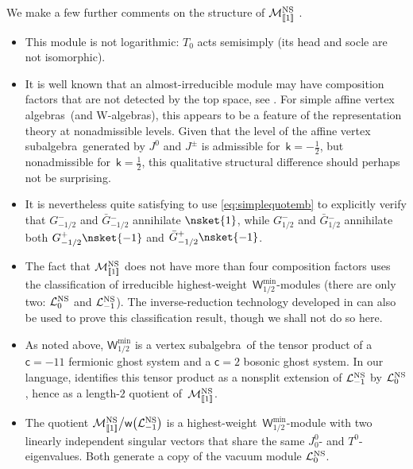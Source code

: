 \documentclass[10pt,a4paper]{amsart}
\numberwithin{equation}{section}
\newcommand{\bG}{\bar{G}{}}
\newcommand{\cc}{\mathsf{c}} %
\newcommand{\kk}{\mathsf{k}} %
\newcommand{\NS}{\textnormal{NS}}
\DeclarePairedDelimiter{\brac}{\lparen}{\rparen} %
\DeclarePairedDelimiter{\dbrac}{\llbracket}{\rrbracket} %
\newcommand{\VOA}[1]{\mathsf{#1}} %
\newcommand{\Mod}[1]{\mathcal{#1}} %
\newcommand{\swalg}[2]{\VOA{W}_{#1}^{\mathrm{#2}}} %
\newcommand{\smin}[1][\kk]{\swalg{#1}{min}} %
\newcommand{\nconjsymb}{\mathsf{w}} %
\newcommand{\nconj}{\nconjsymb \brac}
\newcommand{\nnsrel}[1]{\Mod{M}^{\NS}_{\vphantom{[#1]}\smash{\dbrac{#1}}}} %
\newcommand{\nnsihw}[1]{\Mod{L}^{\NS}_{#1}} %
\newcommand{\hw}{highest-weight}
\newcommand{\va}{vertex algebra}
\newcommand{\vas}{\va s}
\newcommand{\vsa}{vertex subalgebra}
\def\smash#1{#1}
\begin{document}
We make a few further comments on the structure of \smash{$\nnsrel{1}$} .
\begin{itemize}\itemsep=0pt
	\item This module is not logarithmic: $T_0$ acts semisimply (its head and socle are not isomorphic).
	\item It is well known that an almost-irreducible module may have composition factors that are not detected by the top space, see \cite[Section~4.5]{KawRel18}.
	For simple affine \vas\ (and W-algebras), this appears to be a feature of the representation theory at nonadmissible levels.
	Given that the level of the affine \vsa\ generated by $J^0$ and $J^{\pm}$ is admissible for~${\kk=-\frac{1}{2}}$, but nonadmissible for~${\kk=\frac{1}{2}}$, this qualitative structural difference should perhaps not be surprising.
	\item It is nevertheless quite satisfying to use \eqref{eq:simplequotemb} to explicitly verify that \smash{$G^-_{-1/2}$} and \smash{$\bG^-_{-1/2}$} annihilate \smash{$\nsket{1}$}, while \smash{$G^-_{1/2}$} and \smash{$\bG^-_{1/2}$} annihilate both \smash{$G^+_{-1/2} \nsket{-1}$} and \smash{$\bG^+_{-1/2} \nsket{-1}$}.
	\item The fact that \smash{$\nnsrel{1}$} does not have more than four composition factors uses the classification \cite[Proposition~6.2]{AdaRea14} of irreducible \hw\ \smash{$\smin[1/2]$}-modules \big(there are only two: \smash{$\nnsihw{0}$} and \smash{$\nnsihw{-1}$}\big).
	The inverse-reduction technology developed in \cite{AdaWei23} can also be used to prove this classification result, though we shall not do so here.
	\item As noted above, \smash{$\smin[1/2]$} is a \vsa\ of the tensor product of a $\cc=-11$ fermionic ghost system and a $\cc=2$ bosonic ghost system.
	In our language, \cite[Proposition~6.3]{AdaRea14} identifies this tensor product as a nonsplit extension of $\nnsihw{-1}$ by $\nnsihw{0}$, hence as a length-$2$ quotient of~\smash{$\nnsrel{1}$}.
	\item The quotient \smash{$\nnsrel{1} \big/ \nconj[\big]{\nnsihw{-1}}$} is a \hw\ \smash{$\smin[1/2]$}-module with two linearly independent singular vectors that share the same $J^0_0$- and $T^0$-eigenvalues.
	Both generate a copy of the vacuum module $\nnsihw{0}$.
\end{itemize}
\end{document}
